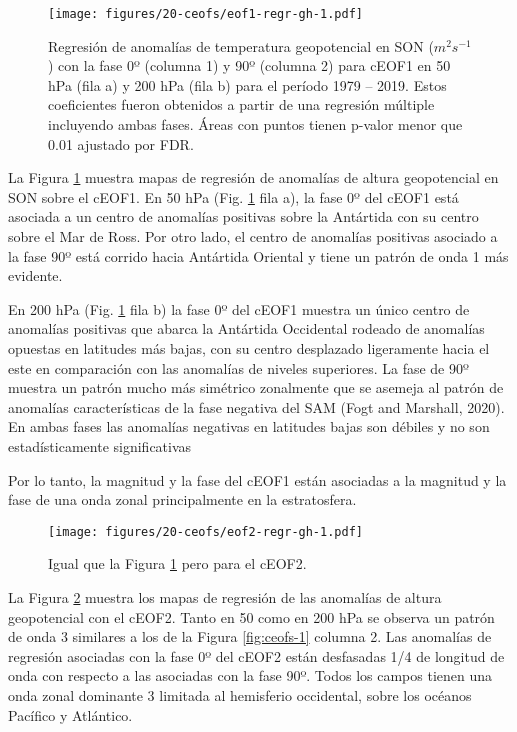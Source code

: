 \documentclass[12pt,oneside]{reedthesis}
\begin{document}
\begin{figure}
\centering
\texttt{[image: figures/20-ceofs/eof1-regr-gh-1.pdf]}
\caption{\label{fig:eof1-regr-gh}Regresión de anomalías de temperatura geopotencial en SON (\(m^2s^{-1}\)) con la fase 0º (columna 1) y 90º (columna 2) para cEOF1 en 50 hPa (fila a) y 200 hPa (fila b) para el período 1979 -- 2019.
Estos coeficientes fueron obtenidos a partir de una regresión múltiple incluyendo ambas fases.
Áreas con puntos tienen p-valor menor que 0.01 ajustado por FDR.}
\end{figure}
La Figura \ref{fig:eof1-regr-gh} muestra mapas de regresión de anomalías de altura geopotencial en SON sobre el cEOF1.
En 50 hPa (Fig. \ref{fig:eof1-regr-gh} fila a), la fase 0º del cEOF1 está asociada a un centro de anomalías positivas sobre la Antártida con su centro sobre el Mar de Ross.
Por otro lado, el centro de anomalías positivas asociado a la fase 90º está corrido hacia Antártida Oriental y tiene un patrón de onda 1 más evidente.

En 200 hPa (Fig. \ref{fig:eof1-regr-gh} fila b) la fase 0º del cEOF1 muestra un único centro de anomalías positivas que abarca la Antártida Occidental rodeado de anomalías opuestas en latitudes más bajas, con su centro desplazado ligeramente hacia el este en comparación con las anomalías de niveles superiores.
La fase de 90º muestra un patrón mucho más simétrico zonalmente que se asemeja al patrón de anomalías características de la fase negativa del SAM (Fogt and Marshall, 2020).
En ambas fases las anomalías negativas en latitudes bajas son débiles y no son estadísticamente significativas

Por lo tanto, la magnitud y la fase del cEOF1 están asociadas a la magnitud y la fase de una onda zonal principalmente en la estratosfera.


\begin{figure}
\centering
\texttt{[image: figures/20-ceofs/eof2-regr-gh-1.pdf]}
\caption{\label{fig:eof2-regr-gh}Igual que la Figura \ref{fig:eof1-regr-gh} pero para el cEOF2.}
\end{figure}
La Figura \ref{fig:eof2-regr-gh} muestra los mapas de regresión de las anomalías de altura geopotencial con el cEOF2.
Tanto en 50 como en 200 hPa se observa un patrón de onda 3 similares a los de la Figura \ref{fig:ceofs-1} columna 2.
Las anomalías de regresión asociadas con la fase 0º del cEOF2 están desfasadas 1/4 de longitud de onda con respecto a las asociadas con la fase 90º.
Todos los campos tienen una onda zonal dominante 3 limitada al hemisferio occidental, sobre los océanos Pacífico y Atlántico.
\end{document}
